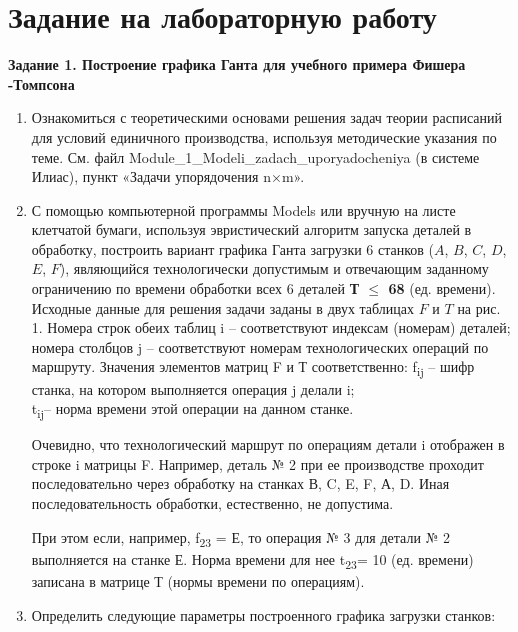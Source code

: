 \documentclass[a4paper,12pt]{article}
\begin{document}


\section{\normalsize{Задание на лабораторную работу}}
\begin{flushleft}
\textbf{Задание 1. Построение графика Ганта для учебного примера Фишера
-Томпсона}
\justify
\begin{enumerate}
\item
  Ознакомиться с теоретическими основами решения задач теории расписаний
  для условий единичного производства, используя методические указания
  по теме. См. файл Module\_1\_Modeli\_zadach\_uporyadocheniya (в
  системе Илиас), пункт «Задачи упорядочения n$\times$m».
\item
  С помощью компьютерной программы Models или вручную на листе клетчатой
  бумаги, используя эвристический алгоритм запуска деталей в обработку,
  построить вариант графика Ганта загрузки 6 станков ($A$, $B$, $C$, $D$, $E$, $F$),
  являющийся технологически допустимым и отвечающим заданному
  ограничению по времени обработки всех 6 деталей \textbf{Т $\le$ 68} (ед.
  времени). Исходные данные для решения задачи заданы в двух таблицах $F$
  и $T$ на рис. 1. Номера строк обеих таблиц i -- соответствуют индексам
  (номерам) деталей; номера столбцов j -- соответствуют номерам
  технологических операций по маршруту. Значения элементов матриц F и Т
  соответственно: f\textsubscript{ij} -- шифр станка, на котором
  выполняется операция j делали i;\\
  t\textsubscript{ij}-- норма времени этой операции на данном станке. 

  Очевидно, что технологический маршрут по операциям детали i отображен в
  строке i матрицы F. Например, деталь № 2 при ее производстве проходит
  последовательно через обработку на станках В, C, E, F, А, D. Иная
  последовательность обработки, естественно, не допустима.

  При этом если, например, f\textsubscript{23 }= Е, то операция № 3 для
  детали № 2 выполняется на станке Е. Норма времени для нее
  t\textsubscript{23}= 10 (ед. времени) записана в матрице Т (нормы
  времени по операциям).

\item
  Определить следующие параметры построенного графика загрузки станков:


\end{enumerate}
\end{flushleft}
\end{document}
